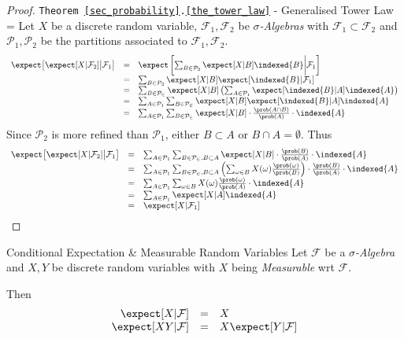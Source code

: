 \documentclass[11pt,a4paper]{article}
\begin{document}
  \begin{proof}{\texttt{Theorem \ref{sec_probability}.\ref{the_tower_law}} - Generalised Tower Law}
    \everymath={\displaystyle}
    Let $X$ be a discrete random variable, $\mathcal{F}_1,\mathcal{F}_2$ be \textit{$\sigma$-Algebras} with $\mathcal{F}_1\subset\mathcal{F}_2$ and $\mathcal{P}_1,\mathcal{P}_2$ be the partitions associated to $\mathcal{F}_1,\mathcal{F}_2$.
    \[\begin{array}{rcl}
      \expect\big[\expect[X|\mathcal{F}_2]\big|\mathcal{F}_1\big]&=&\expect\left[\sum_{B\in\mathcal{P}_2}\expect[X|B]\indexed\{B\}\bigg|\mathcal{F}_1\right]\\
      &=&\sum_{B\in\mathcal{P}_2}\expect[X|B]\expect[\indexed\{B\}|\mathcal{F}_1]\\
      &=&\sum_{B\in\mathcal{P_2}}\expect[X|B]\left(\sum_{A\in\mathcal{P}_1}\expect[\indexed\{B\}|A]\indexed\{A\}\right)\\
      &=&\sum_{A\in\mathcal{P}_1}\sum_{B\in\mathcal{P_2}}\expect[X|B]\expect[\indexed\{B\}|A]\indexed\{A\}\\
      &=&\sum_{A\in\mathcal{P}_1}\sum_{B\in\mathcal{P_2}}\expect[X|B]\cdot\frac{\prob(A\cap B)}{\prob(A)}\cdot\indexed\{A\}
    \end{array}\]
    Since $\mathcal{P}_2$ is more refined than $\mathcal{P}_1$, either $B\subset A$ or $B\cap A=\emptyset$. Thus
    \[\begin{array}{rcl}
      \expect\big[\expect[X|\mathcal{F}_2]\big|\mathcal{F}_1\big]
      &=&\sum_{A\in\mathcal{P}_1}\sum_{B\in\mathcal{P_2},B\subset A}\expect[X|B]\cdot\frac{\prob(B)}{\prob(A)}\cdot\indexed\{A\}\\
      &=&\sum_{A\in\mathcal{P}_1}\sum_{B\in\mathcal{P_2},B\subset A}\left(\sum_{\omega\in B}X(\omega)\frac{\prob(\omega)}{\prob(B)}\right)\cdot\frac{\prob(B)}{\prob(A)}\cdot\indexed\{A\}\\
      &=&\sum_{A\in\mathcal{P}_1}\sum_{\omega\in B}X(\omega)\frac{\prob(\omega)}{\prob(A)}\cdot\indexed\{A\}\\
      &=&\sum_{A\in\mathcal{P}_1}\expect[X|A]\indexed\{A\}\\
      &=&\expect[X|\mathcal{F}_1]
    \end{array}\]
    \proved
  \end{proof}

  \begin{theorem}{Conditional Expectation \& Measurable Random Variables}\label{the_cond_exp_and_measurable}
    Let $\mathcal{F}$ be a \textit{$\sigma$-Algebra} and $X,Y$ be discrete random variables with $X$ being \textit{Measurable} wrt $\mathcal{F}$.
    \par Then
    \[\begin{array}{rcl}
      \expect[X|\mathcal{F}]&=&X\\
      \expect[XY|\mathcal{F}]&=&X\expect[Y|\mathcal{F}]
    \end{array}\]
  \end{theorem}
\end{document}
